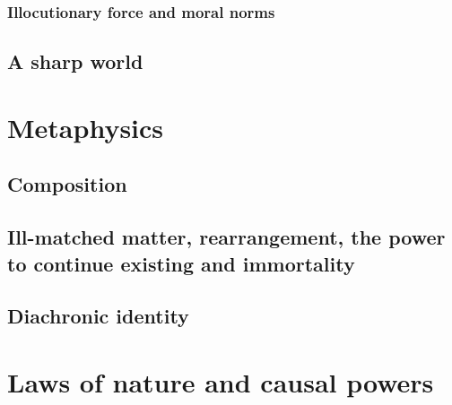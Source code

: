 \subsection{Illocutionary force and moral norms}
\section{A sharp world}
\chaptertail

\def\mychapter{VIII}

\chapter{Metaphysics}\label{ch:metaphysics}
\section{Composition}
\section{Ill-matched matter, rearrangement, the power to continue existing and immortality}
\section{Diachronic identity}
\chaptertail 

\def\mychapter{IX}

\chapter{Laws of nature and causal powers}\label{ch:laws}
\chaptertail


